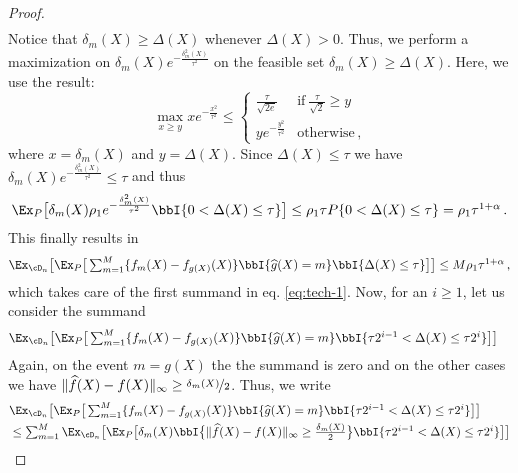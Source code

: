 \begin{proof}
\[\begin{aligned}
    \end{aligned}
    \]
    Notice that $\delta_m(X) \ge \Delta(X)$ whenever $\Delta(X) > 0$. Thus, we perform a maximization on $\delta_m(X)  e^{- \frac{\delta_m^2(X)}{\tau^2} }$ on the feasible set $\delta_m(X) \ge \Delta(X)$. Here, we use the result: 
    \begin{equation}\label{eq:tech-2}
        \max_{x \ge y} xe^{-
        \frac{x^2}{\tau^2 }} \le \begin{cases}
            \frac{\tau }{\sqrt{2e}} & \text{if} ~ \frac{\tau}{\sqrt{2}} \ge y\\
             ye^{-
        \frac{y^2}{\tau^2 }} & \text{otherwise}\,, 
        \end{cases}
    \end{equation} where $x = \delta_m(X)$ and $y = \Delta(X)$. Since $
    \Delta(X) \le \tau$ we have $\delta_m(X)  e^{- \frac{\delta_m^2(X)}{\tau^2} } \le \tau$ and thus
    \[
    \begin{aligned}
        \textstyle \Ex_P\big [ \delta_m(X) \rho_1 e^{- \frac{\delta_m^2(X)}{\tau^2} } \bbI \{ 0 < \Delta(X) \le \tau\}   \big ] \le \rho_1 \tau P\{0 < \Delta(X) \le \tau\} = \rho_1 \tau^{1 + \alpha}\,.
    \end{aligned}
    \] This finally results in 
    \[
    \begin{aligned}
        \textstyle  \Ex_{\cD_n}\big [ \Ex_P\big [ \sum _{m = 1}^M\{f_{m}(X) - f_{g(X)}(X)\} \bbI \{ \widehat g(X) = m\} \bbI \{ \Delta(X) \le \tau\}   \big]\big ] \le M\rho_1\tau^{1+\alpha}\,,
    \end{aligned}
    \] which takes care of the first summand in eq. \eqref{eq:tech-1}. Now, for an $i \ge 1 $, let us consider the summand 
    \[
    \begin{aligned}
        & \textstyle\Ex_{\cD_n}\big [ \Ex_P\big [ \sum _{m = 1}^M\{f_{m}(X) - f_{g(X)}(X)\} \bbI \{ \widehat g(X) = m\} \bbI \{ \tau 2^{i -1} < \Delta(X) \le \tau 2^i \}   \big]\big ]
    \end{aligned}
    \] Again, on the event $m = g(X)$ the the summand is zero and on the other cases we have $\|\widehat f(X) - f(X) \|_\infty \ge \nicefrac{\delta_m(X)}{2}$.
    Thus, we write 
    \[
    \begin{aligned}
        & \textstyle\Ex_{\cD_n}\big [ \Ex_P\big [ \sum _{m = 1}^M\{f_{m}(X) - f_{g(X)}(X)\} \bbI \{ \widehat g(X) = m\} \bbI \{ \tau 2^{i -1} < \Delta(X) \le \tau 2^i \}   \big]\big ]\\
        & \le  \textstyle \textstyle\sum _{m = 1}^M\Ex_{\cD_n}\big [ \Ex_P\big [ \delta_m(X)\bbI \big \{\|\widehat f(X) - f(X) \|_\infty \ge \frac{\delta_m(X)}{2} \big \} \bbI \{ \tau 2^{i -1} < \Delta(X) \le \tau 2^i \}   \big]\big ]\\

\end{aligned}\]
\end{proof}
